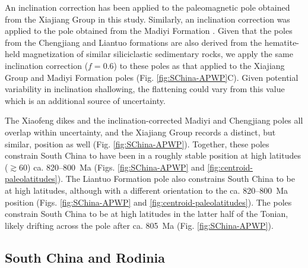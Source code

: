 An inclination correction has been applied to the paleomagnetic pole obtained from the Xiajiang Group in this study. Similarly, an inclination correction was applied to the pole obtained from the Madiyi Formation \citep{Xian2020a}. Given that the poles from the Chengjiang and Liantuo formations are also derived from the hematite-held magnetization of similar siliciclastic sedimentary rocks, we apply the same inclination correction ($f=0.6$) to these poles as that applied to the Xiajiang Group and Madiyi Formation poles (Fig. \ref{fig:SChina-APWP}C). Given potential variability in inclination shallowing, the flattening could vary from this value which is an additional source of uncertainty.

The Xiaofeng dikes and the inclination-corrected Madiyi and Chengjiang poles all overlap within uncertainty, and the Xiajiang Group records a distinct, but similar, position as well (Fig. \ref{fig:SChina-APWP}). Together, these poles constrain South China to have been in a roughly stable position at high latitudes ($\gtrsim$60\degrees) ca. 820--800~Ma (Figs. \ref{fig:SChina-APWP} and \ref{fig:centroid-paleolatitudes}). The Liantuo Formation pole also constrains South China to be at high latitudes, although with a different orientation to the ca. 820--800~Ma position (Figs. \ref{fig:SChina-APWP} and \ref{fig:centroid-paleolatitudes}). The poles constrain South China to be at high latitudes in the latter half of the Tonian, likely drifting across the pole after ca. 805~Ma (Fig. \ref{fig:SChina-APWP}).

\subsection{South China and Rodinia}


